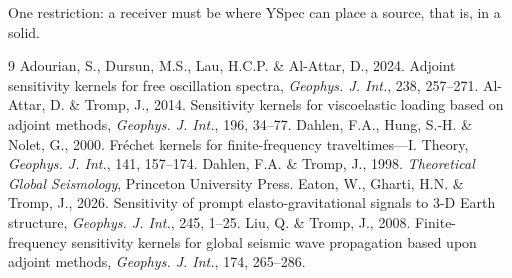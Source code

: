 \documentclass[11pt,a4paper]{article}
\theoremstyle{remark}
\begin{document}
One restriction: a receiver must be where YSpec can place a source, that is,
in a solid.

\begin{thebibliography}{9}
Adourian, S., Dursun, M.S., Lau, H.C.P. \& Al-Attar, D., 2024. Adjoint
sensitivity kernels for free oscillation spectra, \emph{Geophys. J. Int.},
238, 257--271.
Al-Attar, D. \& Tromp, J., 2014. Sensitivity kernels for viscoelastic
loading based on adjoint methods, \emph{Geophys. J. Int.}, 196, 34--77.
Dahlen, F.A., Hung, S.-H. \& Nolet, G., 2000. Fr\'echet kernels for
finite-frequency traveltimes---I. Theory, \emph{Geophys. J. Int.}, 141,
157--174.
Dahlen, F.A. \& Tromp, J., 1998. \emph{Theoretical Global Seismology},
Princeton University Press.
Eaton, W., Gharti, H.N. \& Tromp, J., 2026. Sensitivity of prompt
elasto-gravitational signals to 3-D Earth structure, \emph{Geophys. J.
Int.}, 245, 1--25.
Liu, Q. \& Tromp, J., 2008. Finite-frequency sensitivity kernels for global
seismic wave propagation based upon adjoint methods, \emph{Geophys. J.
Int.}, 174, 265--286.
\end{thebibliography}
\end{document}
